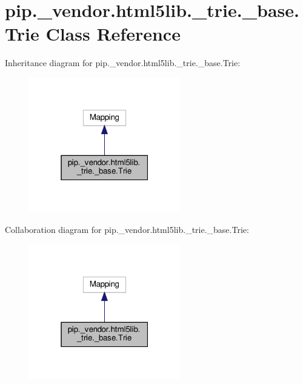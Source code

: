 \hypertarget{classpip_1_1__vendor_1_1html5lib_1_1__trie_1_1__base_1_1Trie}{}\section{pip.\+\_\+vendor.\+html5lib.\+\_\+trie.\+\_\+base.\+Trie Class Reference}
\label{classpip_1_1__vendor_1_1html5lib_1_1__trie_1_1__base_1_1Trie}


Inheritance diagram for pip.\+\_\+vendor.\+html5lib.\+\_\+trie.\+\_\+base.\+Trie\+:
\nopagebreak
\begin{figure}[H]
\begin{center}
\leavevmode
\includegraphics[width=187pt]{classpip_1_1__vendor_1_1html5lib_1_1__trie_1_1__base_1_1Trie__inherit__graph}
\end{center}
\end{figure}


Collaboration diagram for pip.\+\_\+vendor.\+html5lib.\+\_\+trie.\+\_\+base.\+Trie\+:
\nopagebreak
\begin{figure}[H]
\begin{center}
\leavevmode
\includegraphics[width=187pt]{classpip_1_1__vendor_1_1html5lib_1_1__trie_1_1__base_1_1Trie__coll__graph}
\end{center}
\end{figure}
